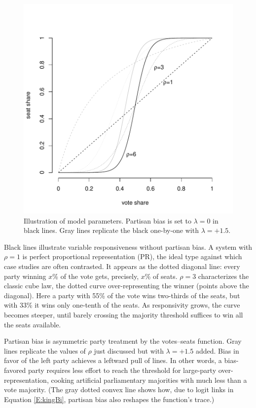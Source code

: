 \documentclass[letter,12pt]{article}
\begin{document}

\begin{figure}
\begin{center}
    \includegraphics[width=.55\columnwidth]{rhoExample.pdf} 
\caption{Illustration of model parameters. Partisan bias is set to $\lambda=0$ in black lines. Gray lines replicate the black one-by-one with $\lambda=+1.5$.}\label{F:lambdaRhoEx}
\end{center}
\end{figure}

Black lines illustrate variable responsiveness without partisan bias. A system with $\rho=1$ is perfect proportional representation (PR), the ideal type against which case studies are often contrasted. It appears as the dotted diagonal line: every party winning $x$\% of the vote gets, precisely, $x$\% of seats. $\rho=3$ characterizes the classic cube law, the dotted curve over-representing the winner (points above the diagonal). Here a party with 55\% of the vote wins two-thirds of the seats, but with 33\% it wins only one-tenth of the seats. As responsivity grows, the curve becomes steeper, until barely crossing the majority threshold suffices to win all the seats available. 

Partisan bias is asymmetric party treatment by the votes--seats function. Gray lines replicate the values of $\rho$ just discussed but with $\lambda = +1.5$ added. Bias in favor of the left party achieves a leftward pull of lines. In other words, a bias-favored party requires less effort to reach the threshold for large-party over-representation, cooking artificial parliamentary majorities with much less than a vote majority. (The gray dotted convex line shows how, due to logit links in Equation \ref{E:kingBi}, partisan bias also reshapes the function's trace.) %
\end{document}
